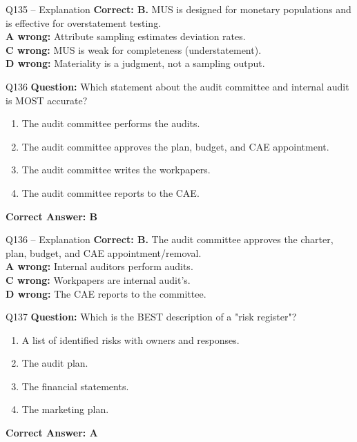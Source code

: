 \documentclass[aspectratio=169,10pt]{beamer}
\begin{document}
	\begin{frame}[t]{Q135 -- Explanation}
		\small
		\textbf{Correct: B.} MUS is designed for monetary populations and is effective for overstatement testing. \\[4pt]
		\textbf{A wrong:} Attribute sampling estimates deviation rates. \\[2pt]
		\textbf{C wrong:} MUS is weak for completeness (understatement). \\[2pt]
		\textbf{D wrong:} Materiality is a judgment, not a sampling output.
	\end{frame}
	
	\begin{frame}[t]{Q136}
		\small
		\textbf{Question:} Which statement about the audit committee and internal audit is MOST accurate?
		\begin{enumerate}[label=\Alph*.,itemsep=1pt,topsep=2pt]
			\item The audit committee performs the audits.
			\item The audit committee approves the plan, budget, and CAE appointment.
			\item The audit committee writes the workpapers.
			\item The audit committee reports to the CAE.
		\end{enumerate}
		\vspace{4pt}
		\textbf{Correct Answer: B}
	\end{frame}
	
	\begin{frame}[t]{Q136 -- Explanation}
		\small
		\textbf{Correct: B.} The audit committee approves the charter, plan, budget, and CAE appointment/removal. \\[4pt]
		\textbf{A wrong:} Internal auditors perform audits. \\[2pt]
		\textbf{C wrong:} Workpapers are internal audit's. \\[2pt]
		\textbf{D wrong:} The CAE reports to the committee.
	\end{frame}
	
	\begin{frame}[t]{Q137}
		\small
		\textbf{Question:} Which is the BEST description of a "risk register"?
		\begin{enumerate}[label=\Alph*.,itemsep=1pt,topsep=2pt]
			\item A list of identified risks with owners and responses.
			\item The audit plan.
			\item The financial statements.
			\item The marketing plan.
		\end{enumerate}
		\vspace{4pt}
		\textbf{Correct Answer: A}
	\end{frame}
	
\end{document}
